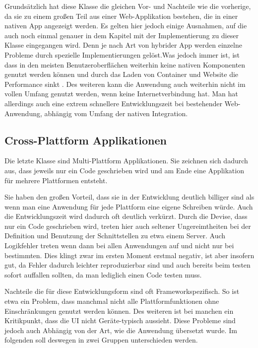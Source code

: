 Grundsätzlich hat diese Klasse die gleichen Vor- und Nachteile wie die vorherige, da sie zu einem großen Teil aus einer Web-Applikation bestehen, die in einer nativen App angezeigt werden. Es gelten hier jedoch einige Ausnahmen, auf die auch noch einmal genauer in dem Kapitel mit der Implementierung zu dieser Klasse eingegangen wird. Denn je nach Art von hybrider App werden einzelne Probleme durch spezielle Implementierungen gelöst.Was jedoch immer ist, ist dass in den meisten Benutzeroberflächen weiterhin keine nativen Komponenten genutzt werden können und durch das Laden von Container und Website die Performance sinkt \cite{IEEE_development_classes}. Des weiteren kann die Anwendung auch weiterhin nicht im vollen Umfang genutzt werden, wenn keine Internetverbindung hat. Man hat allerdings auch eine extrem schnellere Entwicklungszeit bei bestehender Web-Anwendung, abhängig vom Umfang der nativen Integration.

\subsection{Cross-Plattform Applikationen}
Die letzte Klasse sind Multi-Plattform Applikationen. Sie zeichnen sich dadurch aus, dass jeweils nur ein Code geschrieben wird und am Ende eine Applikation für mehrere Plattformen entsteht. 

Sie haben den großen Vorteil, dass sie in der Entwicklung deutlich billiger sind als wenn man eine Anwendung für jede Plattform eine eigene Schreiben würde. Auch die Entwicklungszeit wird dadurch oft deutlich verkürzt. Durch die Devise, dass nur ein Code geschrieben wird, treten hier auch seltener Ungereimtheiten bei der Definition und Benutzung der Schnittstellen zu etwa einem Server. Auch Logikfehler treten wenn dann bei allen Anwendungen auf und nicht nur bei bestimmten. Dies klingt zwar im ersten Moment erstmal negativ, ist aber insofern gut, da Fehler dadurch leichter reproduzierbar sind und auch bereits beim testen sofort auffallen sollten, da man lediglich einen Code testen muss.

Nachteile die für diese Entwicklungsform sind oft Frameworkspezifisch. So ist etwa ein Problem, dass manchmal nicht alle Plattformfunktionen ohne Einschränkungen genutzt werden können. Des weiteren ist bei manchen ein Kritikpunkt, dass die UI nicht Geräte-typisch aussieht. Diese Probleme sind jedoch auch Abhängig von der Art, wie die Anwendung übersetzt wurde. Im folgenden soll deswegen in zwei Gruppen unterschieden werden.

